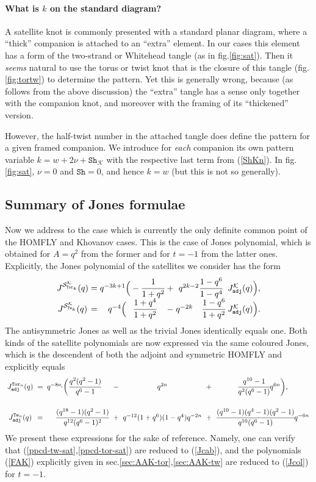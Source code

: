 \documentclass[11pt]{article}
\def\be{\begin{eqnarray}}
\def\ee{\end{eqnarray}}
\def\Km{\mathcal{K}}
\def\Sm{\mathcal{S}}
\def\Tor{\mathtt{Tor}}
\def\Tw{\mathtt{Tw}}
\def\Sh{\mathtt{Sh}}
\def\adj{\mathtt{adj}}
\begin{document}
\paragraph{What is $k$ on the standard diagram?}
A satellite knot is commonly presented with a standard planar diagram, where a ``thick'' companion is attached to an ``extra'' element. In our cases this element has a form of the two-strand or Whitehead tangle (as in fig.\ref{fig:sat}). Then it \textit{seems} natural to use the torus or twist knot that is the closure of this tangle (fig.\ref{fig:tortw}) to determine the pattern. Yet this is generally wrong, because (as follows from the above discussion) the ``extra'' tangle has a sense only together with the companion knot, and moreover with the framing of its ``thickened'' version. 

However, the half-twist number in the attached tangle does define the pattern for a given framed companion. We introduce for \textit{each} companion its own pattern variable $k=w+2\nu+\Sh_{\Km}$ with the respective last term from (\ref{ShKn}).
In fig.\ref{fig:sat}, $\nu=0$ and $\Sh=0$, and hence $k=w$ (but this is not so generally).
\subsection{Summary of Jones formulae\label{sec:Jones}}
Now we address to the case which is currently the only definite common point of the HOMFLY and Khovanov cases. This is the case of Jones polynomial, which is obtained for $A=q^2$ from the former and for $t=-1$ from the latter ones. Explicitly, the Jones polynomial of the satellites we consider has the form
\be
\arraycolsep=0.5mm
\begin{array}{ccccccc}
	J^{\Sm_{\Tor_k}^{\Km}}(q)&=&q^{-3k+1}\Big(-\cfrac{1}{1+q^2}&+&q^{2k-2}\cfrac{1-q^6}{1-q^4}&J^{\Km}_{\adj}(q)\Big),\\
	J^{\Sm_{\Tw_k}^{\Km}}(q)&=&q^{-4}\Big(\phantom{-}\cfrac{1+q^4}{1+q^2}&-&q^{-2k\phantom{-2}}\cfrac{1-q^6}{1+q^2}&J^{\Km}_{\adj}(q)\Big).\label{Jcab}
\end{array}
\ee
The antisymmetric Jones as well as the trivial Jones identically equals one. Both kinds of the satellite polynomials are now expressed via the same coloured Jones, which is the descendent of both the adjoint and symmetric HOMFLY and explicitly equals 
\be
\arraycolsep=1mm
\begin{array}{ccrccccc} 
	J^{\Tor_n}_{\adj}(q)&=&q^{-8n}\!\cdot\!\hspace{-5mm}&\bigg(\cfrac{q^2(q^2-1)}{q^6-1}&-&q^{2n}&+&\cfrac{q^{10}-1}{q^2(q^6-1)}q^{6n}\bigg),\\[8mm]
	J^{\Tw_n}_{\adj}(q)&=&&\cfrac{(q^{18}-1)(q^2-1)}{q^{12}(q^6-1)^2}&+&q^{-12}(1+q^6)(1-q^4)q^{-2n}&+&\cfrac{(q^{10}-1)(q^4-1)(q^2-1)}{q^{10}(q^6-1)}q^{-6n}
	\label{Jcol}
\end{array}
\ee
We present these expressions for the sake of reference. Namely, one can verify that (\ref{ppcd-tw-sat},\ref{ppcd-tor-sat}) are reduced to (\ref{Jcab}), and the polynomials (\ref{FAK}) explicitly given in sec.\ref{sec:AAK-tor},\ref{sec:AAK-tw} are reduced to (\ref{Jcol}) for $t=-1$.
\end{document}
